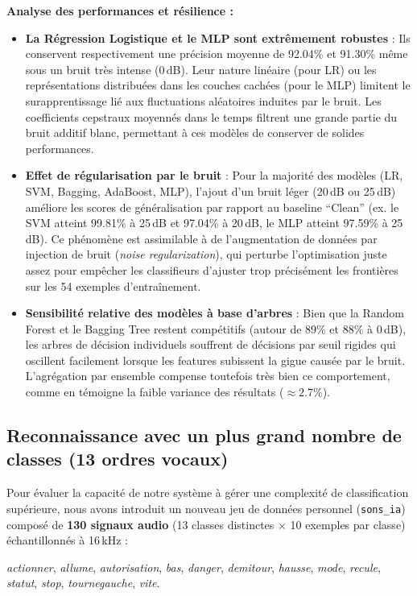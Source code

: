\documentclass{name}
\begin{document}
\textbf{Analyse des performances et résilience :}
\begin{itemize}
    \item \textbf{La Régression Logistique et le MLP sont extrêmement robustes} : Ils conservent respectivement une précision moyenne de 92.04\% et 91.30\% même sous un bruit très intense (0\,dB). Leur nature linéaire (pour LR) ou les représentations distribuées dans les couches cachées (pour le MLP) limitent le surapprentissage lié aux fluctuations aléatoires induites par le bruit. Les coefficients cepstraux moyennés dans le temps filtrent une grande partie du bruit additif blanc, permettant à ces modèles de conserver de solides performances.
    \item \textbf{Effet de régularisation par le bruit} : Pour la majorité des modèles (LR, SVM, Bagging, AdaBoost, MLP), l'ajout d'un bruit léger (20\,dB ou 25\,dB) améliore les scores de généralisation par rapport au baseline ``Clean'' (ex. le SVM atteint 99.81\% à 25\,dB et 97.04\% à 20\,dB, le MLP atteint 97.59\% à 25\,dB). Ce phénomène est assimilable à de l'augmentation de données par injection de bruit (\textit{noise regularization}), qui perturbe l'optimisation juste assez pour empêcher les classifieurs d'ajuster trop précisément les frontières sur les 54 exemples d'entraînement.
    \item \textbf{Sensibilité relative des modèles à base d'arbres} : Bien que la Random Forest et le Bagging Tree restent compétitifs (autour de 89\% et 88\% à 0\,dB), les arbres de décision individuels souffrent de décisions par seuil rigides qui oscillent facilement lorsque les features subissent la gigue causée par le bruit. L'agrégation par ensemble compense toutefois très bien ce comportement, comme en témoigne la faible variance des résultats ($\approx 2.7\%$).
\end{itemize}
\subsection{Reconnaissance avec un plus grand nombre de classes (13 ordres vocaux)}

Pour évaluer la capacité de notre système à gérer une complexité de classification supérieure, nous avons introduit un nouveau jeu de données personnel (\texttt{sons\_ia}) composé de \textbf{130 signaux audio} (13 classes distinctes $\times$ 10 exemples par classe) échantillonnés à 16\,kHz :
\begin{center}
\textit{actionner}, \textit{allume}, \textit{autorisation}, \textit{bas}, \textit{danger}, \textit{demitour}, \textit{hausse}, \textit{mode}, \textit{recule}, \textit{statut}, \textit{stop}, \textit{tournegauche}, \textit{vite}.
\end{center}
\end{document}
